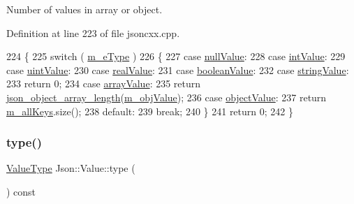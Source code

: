 Number of values in array or object. 



Definition at line 223 of file jsoncxx.\+cpp.


\begin{DoxyCode}
224     \{
225         \textcolor{keywordflow}{switch} ( \hyperlink{class_json_1_1_value_ae6116e08a5c1833f858c1d29156365b1}{m\_eType} )
226         \{
227         \textcolor{keywordflow}{case} \hyperlink{namespace_json_a7d654b75c16a57007925868e38212b4ea7d9899633b4409bd3fc107e6737f8391}{nullValue}:
228         \textcolor{keywordflow}{case} \hyperlink{namespace_json_a7d654b75c16a57007925868e38212b4eae5a9d708d5c9e23ae9bf98898522512d}{intValue}:
229         \textcolor{keywordflow}{case} \hyperlink{namespace_json_a7d654b75c16a57007925868e38212b4eaea788d9a3bb00adc6d68d97d43e1ccd3}{uintValue}:
230         \textcolor{keywordflow}{case} \hyperlink{namespace_json_a7d654b75c16a57007925868e38212b4eab837c7b869c14d8be712deb45c9e490e}{realValue}:
231         \textcolor{keywordflow}{case} \hyperlink{namespace_json_a7d654b75c16a57007925868e38212b4ea14c30dbf4da86f7b809be299f671f7fd}{booleanValue}:
232         \textcolor{keywordflow}{case} \hyperlink{namespace_json_a7d654b75c16a57007925868e38212b4ea804ef857affea2d415843c73f261c258}{stringValue}:
233             \textcolor{keywordflow}{return} 0;
234         \textcolor{keywordflow}{case} \hyperlink{namespace_json_a7d654b75c16a57007925868e38212b4eadc8f264f36b55b063c78126b335415f4}{arrayValue}:
235             \textcolor{keywordflow}{return} \hyperlink{json__object_8c_ab4effb08356b83d77b4e1914467a2078}{json\_object\_array\_length}(\hyperlink{class_json_1_1_value_a3a705e06c2dbc4a6e142b58b0cbca57e}{m\_objValue});
236         \textcolor{keywordflow}{case} \hyperlink{namespace_json_a7d654b75c16a57007925868e38212b4eae8386dcfc36d1ae897745f7b4f77a1f6}{objectValue}:
237             \textcolor{keywordflow}{return} \hyperlink{class_json_1_1_value_a914e4896d12ffa87726125d2f60ea9c0}{m\_allKeys}.size();
238         \textcolor{keywordflow}{default}:
239             \textcolor{keywordflow}{break};
240         \}
241         \textcolor{keywordflow}{return} 0;
242     \}
\end{DoxyCode}
\mbox{\label{class_json_1_1_value_a8ce61157a011894f0252ceed232312de}} 
\subsubsection{\texorpdfstring{type()}{type()}}
{\footnotesize\ttfamily \hyperlink{namespace_json_a7d654b75c16a57007925868e38212b4e}{Value\+Type} Json\+::\+Value\+::type (\begin{DoxyParamCaption}{ }\end{DoxyParamCaption}) const}



